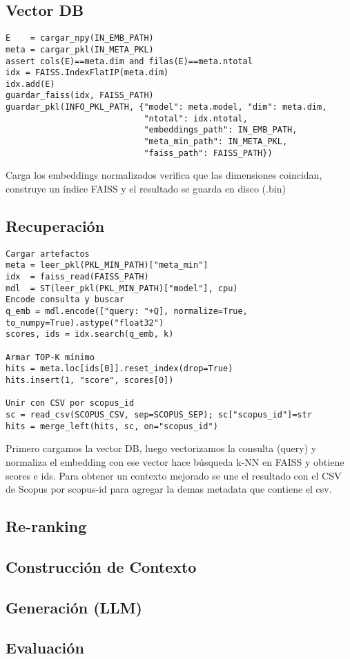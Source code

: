\subsection{Vector DB}
\begin{verbatim}
E    = cargar_npy(IN_EMB_PATH)      
meta = cargar_pkl(IN_META_PKL)       
assert cols(E)==meta.dim and filas(E)==meta.ntotal
idx = FAISS.IndexFlatIP(meta.dim) 
idx.add(E)
guardar_faiss(idx, FAISS_PATH)
guardar_pkl(INFO_PKL_PATH, {"model": meta.model, "dim": meta.dim,
                            "ntotal": idx.ntotal,
                            "embeddings_path": IN_EMB_PATH,
                            "meta_min_path": IN_META_PKL,
                            "faiss_path": FAISS_PATH})
\end{verbatim}
Carga los embeddings normalizados verifica que las dimensiones coincidan, construye un índice FAISS y  el resultado se guarda en disco (.bin)

\subsection{Recuperación}
\begin{verbatim}
Cargar artefactos
meta = leer_pkl(PKL_MIN_PATH)["meta_min"]         
idx  = faiss_read(FAISS_PATH)
mdl  = ST(leer_pkl(PKL_MIN_PATH)["model"], cpu)   
Encode consulta y buscar
q_emb = mdl.encode(["query: "+Q], normalize=True, to_numpy=True).astype("float32")
scores, ids = idx.search(q_emb, k)

Armar TOP-K mínimo
hits = meta.loc[ids[0]].reset_index(drop=True)
hits.insert(1, "score", scores[0])

Unir con CSV por scopus_id
sc = read_csv(SCOPUS_CSV, sep=SCOPUS_SEP); sc["scopus_id"]=str
hits = merge_left(hits, sc, on="scopus_id")
\end{verbatim}
Primero cargamos la vector DB, luego vectorizamos  la consulta (query) y normaliza el embedding con ese vector hace búsqueda k-NN en FAISS y obtiene scores e ids.
Para obtener un contexto mejorado se une el resultado con el CSV de Scopus por scopus-id para agregar la demas metadata que contiene el csv.
\subsection{Re-ranking}

\subsection{Construcción de Contexto}

\subsection{Generación (LLM)}

\subsection{Evaluación}

